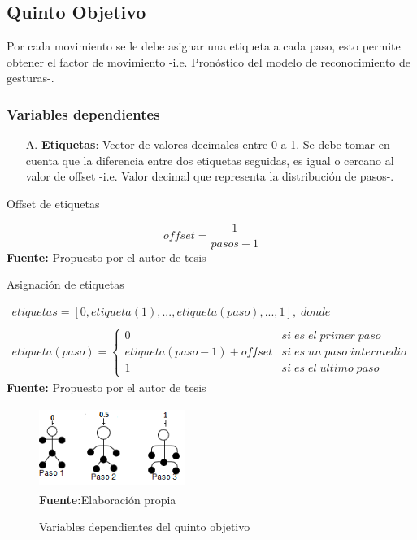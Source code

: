 \subsection{Quinto Objetivo} \label{vr:5o}
Por cada movimiento se le debe asignar una etiqueta a cada paso, esto permite obtener el factor de movimiento -i.e. Pron\'ostico del modelo de reconocimiento de gesturas-.
\subsubsection{Variables dependientes} \label{vr:5o:dep}
\begin{enumerate}
	\item[A.] \textbf{Etiquetas}: Vector de valores decimales entre 0 a 1. Se debe tomar en cuenta que la diferencia entre dos etiquetas seguidas, es igual o cercano al valor de offset -i.e. Valor decimal que representa la distribuci\'on de pasos-.  
\end{enumerate}	
\medbreak
\begin{formula}[h]
	\centering
	\caption{Offset de etiquetas}
	\label{frm:offsetEt}
	\begin{equation}
offset = \frac{1}{pasos-1}
	\end{equation}
	\textbf{Fuente:} Propuesto por el autor de tesis
\end{formula}
\medbreak
\begin{formula}[h]
	\centering
	\caption{Asignaci\'on de etiquetas}
	\label{frm:vecEtiq}
	\begin{equation}
\begin{matrix}
etiquetas=[0, etiqueta(1), ..., etiqueta(paso), ..., 1],\; donde
\\
\\
etiqueta(paso) =
\left\{\begin{matrix}
0 & si\; es\; el\; primer \; paso
\\
etiqueta(paso-1)+offset & si\; es\; un\; paso\; intermedio
\\ 
1 & si\; es\; el\; ultimo\; paso
\end{matrix}\right.
\end{matrix}
	\end{equation}
	\textbf{Fuente:} Propuesto por el autor de tesis
\end{formula}  
\medbreak
\begin{figure}[H]
	\caption{Variables dependientes del quinto objetivo}
	\label{fig:varIdep4}
	\centering
	\includegraphics[width=180px,height=100px]{graphics/var-5obj.png} \\
	\textbf{Fuente:}Elaboraci\'on propia 
\end{figure}
